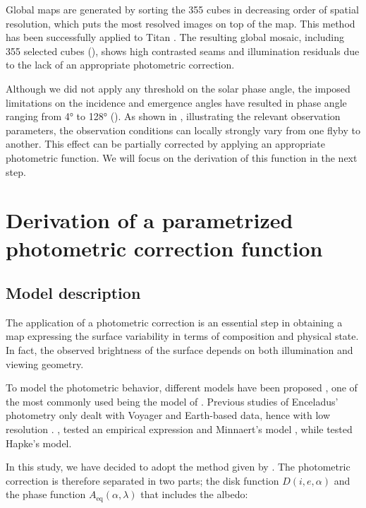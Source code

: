\documentclass{arxiv-icarus}
\begin{document}
Global maps are generated by sorting the 355 cubes in decreasing order of spatial resolution, which puts the most resolved images on top of the map. This method has been successfully applied to Titan \citep{LeMouelic2019}. The resulting global mosaic, including 355 selected cubes (), shows high contrasted seams and illumination residuals due to the lack of an appropriate photometric correction.


Although we did not apply any threshold on the solar phase angle, the imposed limitations on the incidence and emergence angles have resulted in phase angle ranging from \ang{4} to \ang{128} (). As shown in , illustrating the relevant observation parameters, the observation conditions can locally strongly vary from one flyby to another. This effect can be partially corrected by applying an appropriate photometric function. We will focus on the derivation of this function in the next step.

\section{Derivation of a parametrized photometric correction function}\label{sec:sec_3}
\subsection{Model description}

The application of a photometric correction is an essential step in obtaining a map expressing the surface variability in terms of composition and physical state. In fact, the observed brightness of the surface depends on both illumination and viewing geometry.

To model the photometric behavior, different models have been proposed \citep{Minnaert1941, Buratti1985a, Shkuratov2011}, one of the most commonly used being the model of \cite{Hapke1963, Hapke1981, Hapke2012}. Previous studies of Enceladus' photometry only dealt with Voyager and Earth-based data, hence with low resolution \citep{Buratti1984, Buratti1984b, Verbiscer1994}. \cite{Buratti1984}, tested an empirical expression and Minnaert's model \citep[eqs. (1) and (2) in][]{Buratti1984}, while \cite{Verbiscer1994} tested Hapke's model.

In this study, we have decided to adopt the method given by \cite{Shkuratov2011}. The photometric correction is therefore separated in two parts; the disk function $D(i, e, \alpha)$ and the phase function $A_\textrm{eq} (\alpha, \lambda)$ that includes the albedo:
\end{document}
